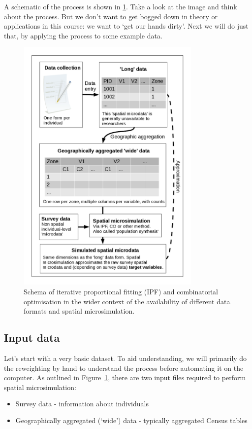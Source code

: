 \documentclass[a4paper, 11pt, twoside]{article}
\begin{document}
A schematic of the process is shown in \cref{fmsim-schema}.
Take a look at the image and think about the process. But we don't want to get
bogged down in theory or applications in this course: we want to `get our
hands dirty'. Next we will do just that, by applying the process to some
example data.

\begin{figure}[H]
\begin{center}
  \includegraphics[width=9cm]{msim-schema}
\end{center}
\caption{Schema of iterative proportional fitting (IPF) and combinatorial
optimisation
in the wider context of the availability of different data formats and spatial
microsimulation. \label{fmsim-schema}}
\end{figure}


\subsection{Input data} \label{s:theory}

Let's start with a very basic dataset. To aid understanding, we will primarily do
the reweighting by hand to understand the process before automating it on the computer.
As outlined in Figure~\ref{fmsim-schema}, there are two input files required to perform spatial microsimulation:
\begin{itemize}
  \item Survey data - information about individuals
  \item Geographically aggregated (`wide') data - typically aggregated Census tables
\end{itemize}
\end{document}
